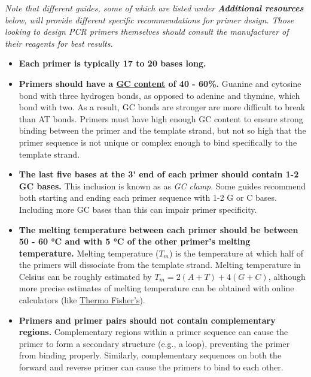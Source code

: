\documentclass[letterpaper, 12pt]{article}
\begin{document}
\textit{Note that different guides, some of which are listed under \textbf{Additional resources} below, will provide different specific recommendations for primer design. Those looking to design PCR primers themselves should consult the manufacturer of their reagents for best results.}

\begin{itemize}
    \setlength\itemsep{-0.5em}
    \item \textbf{Each primer is typically 17 to 20 bases long.}
    \item \textbf{Primers should have a \href{https://en.wikipedia.org/wiki/GC-content}{GC content} of 40 - 60\%.} Guanine and cytosine bond with three hydrogen bonds, as opposed to adenine and thymine, which bond with two. As a result, GC bonds are stronger are more difficult to break than AT bonds. Primers must have high enough GC content to ensure strong binding between the primer and the template strand, but not so high that the primer sequence is not unique or complex enough to bind specifically to the template strand.
    \item \textbf{The last five bases at the 3\'{} end of each primer should contain 1-2 GC bases.} This inclusion is known as as \emph{GC clamp}. Some guides recommend both starting and ending each primer sequence with 1-2 G or C bases. Including more GC bases than this can impair primer specificity. 
    \item \textbf{The melting temperature between each primer should be between 50 - 60 °C and with 5 °C of the other primer's melting temperature.} Melting temperature ($T_m$) is the temperature at which half of the primers will dissociate from the template strand. Melting temperature in Celsius can be roughly estimated by $T_m = 2(A+T) + 4(G+C)$, although more precise estimates of melting temperature can be obtained with online calculators (like \href{https://www.thermofisher.com/us/en/home/brands/thermo-scientific/molecular-biology/molecular-biology-learning-center/molecular-biology-resource-library/thermo-scientific-web-tools/tm-calculator.html}{Thermo Fisher's}).
    \item \textbf{Primers and primer pairs should not contain complementary regions.} Complementary regions within a primer sequence can cause the primer to form a secondary structure (e.g., a loop), preventing the primer from binding properly. Similarly, complementary sequences on both the forward and reverse primer can cause the primers to bind to each other.
\end{itemize}
\end{document}
